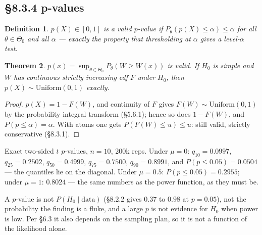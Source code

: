 \documentclass[11pt]{article}
\newtheorem{theorem}{Theorem}[section]
\newtheorem{definition}[theorem]{Definition}
\begin{document}
\subsection{\S8.3.4 p-values}
\begin{definition}
$p(X)\in[0,1]$ is a valid $p$-value if $P_\theta(p(X)\le\alpha)\le\alpha$ for all $\theta\in\Theta_0$ and all $\alpha$ --- exactly the property that thresholding at $\alpha$ gives a level-$\alpha$ test.
\end{definition}
\begin{theorem}
$p(x)=\sup_{\theta\in\Theta_0}P_\theta(W\ge W(x))$ is valid. If $H_0$ is simple and $W$ has continuous strictly increasing cdf $F$ under $H_0$, then $p(X)\sim\mathrm{Uniform}(0,1)$ exactly.
\end{theorem}
\begin{proof}
$p(X)=1-F(W)$, and continuity of $F$ gives $F(W)\sim\mathrm{Uniform}(0,1)$ by the probability integral transform (\S5.6.1); hence so does $1-F(W)$, and $P(p\le\alpha)=\alpha$. With atoms one gets $P(F(W)\le u)\le u$: still valid, strictly conservative (\S8.3.1).
\end{proof}
\begin{simbox}
Exact two-sided $t$ $p$-values, $n=10$, 200k reps. Under $\mu=0$: $q_{10}=0.0997$, $q_{25}=0.2502$, $q_{50}=0.4999$, $q_{75}=0.7500$, $q_{90}=0.8991$, and $P(p\le0.05)=0.0504$ --- the quantiles lie on the diagonal. Under $\mu=0.5$: $P(p\le0.05)=0.2955$; under $\mu=1$: $0.8024$ --- the same numbers as the power function, as they must be.
\end{simbox}
\begin{flagbox}
A $p$-value is not $P(H_0\mid\text{data})$ (\S8.2.2 gives $0.37$ to $0.98$ at $p=0.05$), not the probability the finding is a fluke, and a large $p$ is not evidence for $H_0$ when power is low. Per \S6.3 it also depends on the sampling plan, so it is not a function of the likelihood alone.
\end{flagbox}
\end{document}
